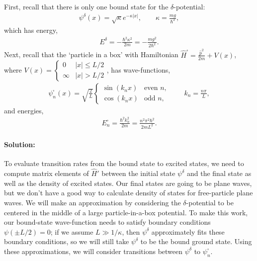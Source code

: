 \documentclass[10pt]{article}
\newcommand{\1}{\mathbf 1}
\begin{document}
First, recall that there is only one bound state for the $\delta$-potential:
\begin{align}
	\psi^\delta(x) = \sqrt{\kappa}e^{-\kappa|x|}, \qquad \kappa = \frac{mg}{\hbar^2},
\end{align}
which has energy,
\begin{align}
	E^\delta =- \frac{\hbar^2 \kappa^2}{2 m} = - \frac{m g^2}{2 \hbar^2}.
\end{align}
Next, recall that the `particle in a box' with Hamiltonian $\hat H^\square = \frac{\hat p^2}{2m} + V(x)$, where $V(x) = \begin{cases}
	0 & |x| \leq L/2\\
	\infty & |x| > L/2
\end{cases}$,
has wave-functions,
\begin{align}
	\psi_n^\square(x) = \sqrt{\frac{2}{L}} 
	\begin{cases}
		\sin(k_n x) & \text{even $n$},\\
		\cos(k_n x) & \text{odd $n$},
	\end{cases}
	\qquad 
	k_n = \frac{n\pi}{L},
\end{align}
and energies,
\begin{align}
	E_n^\square = \frac{\hbar^2  k_n^2}{2m} =\frac{n^2 \pi^2\hbar^2}{2m L^2}.
\end{align}


\paragraph{Solution:}

To evaluate transition rates from the bound state to excited states, we need to compute matrix elements of $\hat H'$ between the initial state $\psi^\delta$ and the final state as well as the density of excited states.
Our final states are going to be plane waves, but we don't have a good way to calculate density of states for free-particle plane waves.
We will make an approximation by considering the $\delta$-potential to be centered in the middle of a large particle-in-a-box potential.
To make this work, our bound-state wave-function needs to satisfy boundary conditions $\psi(\pm L/2) = 0$; if we assume $L \gg 1/\kappa$, then $\psi^\delta$ approximately fits these boundary conditions, so we will still take $\psi^\delta$ to be the bound ground state.
Using these approximations, we will consider transitions between $\psi^\delta$ to $\psi^\square_n$.
\end{document}
